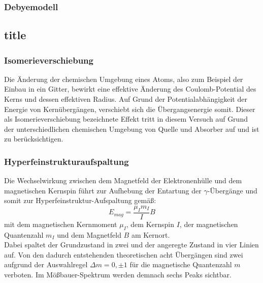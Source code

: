 \subsubsection{Debyemodell}



\subsection{title}

\subsubsection{Isomerieverschiebung}

Die Änderung der chemischen Umgebung eines Atoms, also zum Beispiel der Einbau in ein Gitter, bewirkt eine effektive Änderung des Coulomb-Potential des Kerns und dessen effektiven Radius. Auf Grund der Potentialabhängigkeit der Energie von Kernübergängen, verschiebt sich die Übergangsenergie somit. Dieser als Isomerieverschiebung bezeichnete Effekt tritt in diesem Versuch auf Grund der unterschiedlichen chemischen Umgebung von Quelle und Absorber auf und ist zu berücksichtigen.



\subsubsection{Hyperfeinstrukturaufspaltung}

Die Wechselwirkung zwischen dem Magnetfeld der Elektronenhülle und dem magnetischen Kernspin führt zur Aufhebung der Entartung der $\gamma$-Übergänge und somit zur Hyperfeinstruktur-Aufspaltung gemäß: 
\[E_{mag} = \frac{\mu_I m_I}{I}B\]
mit dem magnetischen Kernmoment $\mu_I$, dem Kernspin $I$, der magnetischen Quantenzahl $m_I$ und dem Magnetfeld $B$ am Kernort.\\
Dabei spaltet der Grundzustand in zwei und der angeregte Zustand in vier Linien auf. Von den dadurch entstehenden theoretischen acht Übergängen sind zwei aufgrund der Auswahlregel $\Delta m =0, \pm 1$ für die magnetische Quantenzahl $m$ verboten. Im Mößbauer-Spektrum werden demnach sechs Peaks sichtbar.


